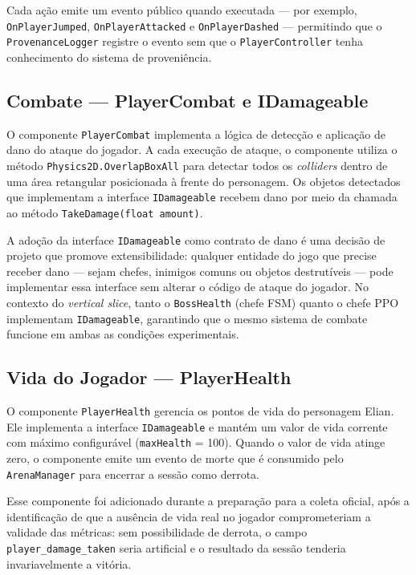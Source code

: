Cada ação emite um evento público quando executada --- por exemplo,
\texttt{OnPlayerJumped}, \texttt{OnPlayerAttacked} e
\texttt{OnPlayerDashed} --- permitindo que o \texttt{ProvenanceLogger}
registre o evento sem que o \texttt{PlayerController} tenha conhecimento do
sistema de proveniência.

\subsection{Combate --- PlayerCombat e IDamageable}
\label{subsec:player-combat}

O componente \texttt{PlayerCombat} implementa a lógica de detecção e
aplicação de dano do ataque do jogador. A cada execução de ataque, o
componente utiliza o método \texttt{Physics2D.OverlapBoxAll} para detectar
todos os \textit{colliders} dentro de uma área retangular posicionada à
frente do personagem. Os objetos detectados que implementam a interface
\texttt{IDamageable} recebem dano por meio da chamada ao método
\texttt{TakeDamage(float amount)}.

A adoção da interface \texttt{IDamageable} como contrato de dano é uma
decisão de projeto que promove extensibilidade: qualquer entidade do jogo que
precise receber dano --- sejam chefes, inimigos comuns ou objetos destrutíveis
--- pode implementar essa interface sem alterar o código de ataque do jogador.
No contexto do \textit{vertical slice}, tanto o \texttt{BossHealth} (chefe
FSM) quanto o chefe PPO implementam \texttt{IDamageable}, garantindo que o
mesmo sistema de combate funcione em ambas as condições experimentais.

\subsection{Vida do Jogador --- PlayerHealth}
\label{subsec:player-health}

O componente \texttt{PlayerHealth} gerencia os pontos de vida do personagem
Elian. Ele implementa a interface \texttt{IDamageable} e mantém um valor de
vida corrente com máximo configurável (\texttt{maxHealth} = 100). Quando o
valor de vida atinge zero, o componente emite um evento de morte que é
consumido pelo \texttt{ArenaManager} para encerrar a sessão como derrota.

Esse componente foi adicionado durante a preparação para a coleta oficial,
após a identificação de que a ausência de vida real no jogador comprometeriam
a validade das métricas: sem possibilidade de derrota, o campo
\texttt{player\_damage\_taken} seria artificial e o resultado da sessão
tenderia invariavelmente a vitória.

